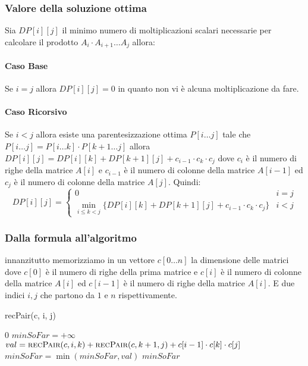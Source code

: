             \subsubsection{Valore della soluzione ottima}
                Sia $DP[i][j]$ il minimo numero di moltiplicazioni scalari necessarie per calcolare il prodotto $A_i\cdot A_{i+1}\dots A_j$ allora:
                \paragraph{Caso Base} Se $i=j$ allora $DP[i][j]=0$ in quanto non vi è alcuna moltiplicazione da fare.
                \paragraph{Caso Ricorsivo} Se $i<j$ allora esiste una parentesizzazione ottima $P[i\dots j]$ tale che $P[i\dots j]=P[i\dots k]\cdot P[k+1\dots j]$ allora $DP[i][j] = DP[i][k]+DP[k+1][j]+c_{i-1}\cdot c_k \cdot c_j$ dove $c_i$ è il numero di righe della matrice $A[i]$ e $c_{i-1}$ è il numero di colonne della matrice $A[i-1]$ ed $c_j$ è il numero di colonne della matrice $A[j]$.\newline
                Quindi: $$
                    DP[i][j]=\begin{cases}
                        0 & i=j\\
                        \min_{i\leq k<j}\{DP[i][k]+DP[k+1][j]+c_{i-1}\cdot c_k \cdot c_j\} & i<j
                    \end{cases}
                $$
            \subsubsection{Dalla formula all'algoritmo}
            innanzitutto memorizziamo in un vettore $c[0\dots n]$ la dimensione delle matrici dove $c[0]$ è il numero di righe della prima matrice e $c[i]$ è il numero di colonne della matrice $A[i]$ ed $c[i-1]$ è il numero di righe della matrice $A[i]$. E due indici $i,j$ che partono da $1$ e $n$ rispettivamente.
            \begin{algorithm}[H]
                \caption{\Int recPair(\Int c, \Int i, \Int j)}
                \begin{algorithmic}
                        \State \Return $0$
                    \Else
                        \State $minSoFar = +\infty$
                            \State $val = \Call{recPair}{c, i, k}+\Call{recPair}{c, k+1, j}+c[i-1]\cdot c[k]\cdot c[j]$
                            \State $minSoFar = \min(minSoFar, val)$
                        \EndFor
                        \State \Return $minSoFar$
                    \EndIf
                \end{algorithmic}
            \end{algorithm}
